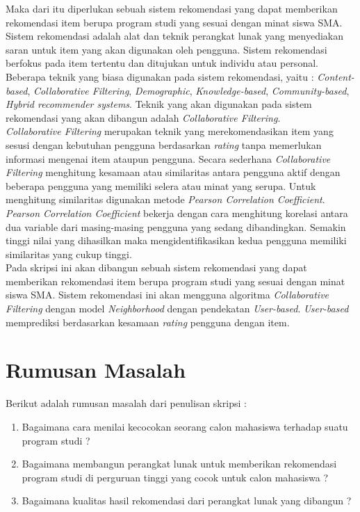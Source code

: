 Maka dari itu diperlukan sebuah sistem rekomendasi yang dapat memberikan rekomendasi item berupa program studi yang sesuai dengan minat siswa SMA. Sistem rekomendasi adalah alat dan teknik perangkat lunak yang menyediakan saran untuk item yang akan digunakan oleh pengguna. Sistem rekomendasi berfokus pada item tertentu dan ditujukan untuk individu atau personal. Beberapa teknik yang biasa digunakan pada sistem rekomendasi, yaitu : \textit{Content-based}, \textit{Collaborative Filtering}, \textit{Demographic}, \textit{Knowledge-based}, \textit{Community-based}, \textit{Hybrid recommender systems}. Teknik yang akan digunakan pada sistem rekomendasi yang akan dibangun adalah \textit{Collaborative Filtering}.\\

\textit{Collaborative Filtering} merupakan teknik yang merekomendasikan item yang sesusi dengan kebutuhan pengguna berdasarkan \textit{rating} tanpa memerlukan informasi mengenai item ataupun pengguna. Secara sederhana \textit{Collaborative Filtering} menghitung kesamaan atau similaritas antara pengguna aktif dengan beberapa pengguna yang memiliki selera atau minat yang serupa. Untuk menghitung similaritas digunakan metode \textit{Pearson Correlation Coefficient}. \textit{Pearson Correlation Coefficient} bekerja dengan cara menghitung korelasi antara dua variable dari masing-masing pengguna yang sedang dibandingkan. Semakin tinggi nilai yang dihasilkan maka mengidentifikasikan kedua pengguna memiliki similaritas yang cukup tinggi. \\
 
Pada skripsi ini akan dibangun sebuah sistem rekomendasi yang dapat memberikan rekomendasi item berupa program studi yang sesuai dengan minat siswa SMA. Sistem rekomendasi ini akan mengguna algoritma \textit{Collaborative Filtering} dengan model \textit{Neighborhood} dengan pendekatan \textit{User-based}. \textit{User-based} memprediksi berdasarkan kesamaan \textit{rating} pengguna dengan item.

\section{Rumusan Masalah}
\label{sec:rumusan}
Berikut adalah rumusan masalah dari penulisan skripsi : \\

\begin{enumerate}
	\item Bagaimana cara menilai kecocokan seorang calon mahasiswa terhadap suatu program studi ?
	\item Bagaimana membangun perangkat lunak untuk memberikan rekomendasi program studi di perguruan tinggi yang cocok untuk calon mahasiswa ?
	\item Bagaimana kualitas hasil rekomendasi dari perangkat lunak yang dibangun ?
\end{enumerate}

